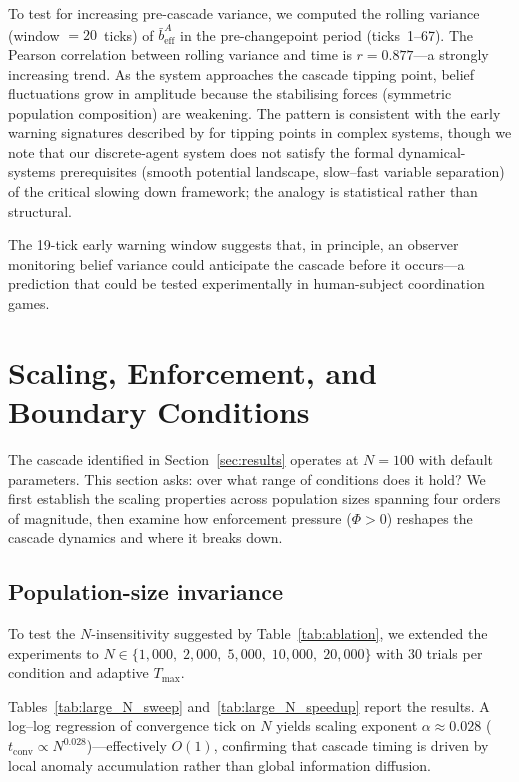 \documentclass[11pt,a4paper]{article}
\begin{document}
To test for increasing pre-cascade variance, we computed the rolling variance (window $= 20$~ticks) of $\bar{b}_{\mathrm{eff}}^A$ in the pre-changepoint period (ticks~1--67). The Pearson correlation between rolling variance and time is $r = 0.877$---a strongly increasing trend. As the system approaches the cascade tipping point, belief fluctuations grow in amplitude because the stabilising forces (symmetric population composition) are weakening. The pattern is consistent with the early warning signatures described by \citet{scheffer2009early} for tipping points in complex systems, though we note that our discrete-agent system does not satisfy the formal dynamical-systems prerequisites (smooth potential landscape, slow--fast variable separation) of the critical slowing down framework; the analogy is statistical rather than structural.

The 19-tick early warning window suggests that, in principle, an observer monitoring belief variance could anticipate the cascade before it occurs---a prediction that could be tested experimentally in human-subject coordination games.

\section{Scaling, Enforcement, and Boundary Conditions}
\label{sec:boundaries}
\label{sec:enforcement}

The cascade identified in Section~\ref{sec:results} operates at $N{=}100$ with default parameters. This section asks: over what range of conditions does it hold? We first establish the scaling properties across population sizes spanning four orders of magnitude, then examine how enforcement pressure ($\Phi > 0$) reshapes the cascade dynamics and where it breaks down.

\subsection{Population-size invariance}
\label{sec:scaling}

To test the $N$-insensitivity suggested by Table~\ref{tab:ablation}, we extended the experiments to $N \in \{1{,}000,\; 2{,}000,\; 5{,}000,\; 10{,}000,\; 20{,}000\}$ with 30 trials per condition and adaptive $T_{\max}$.

Tables~\ref{tab:large_N_sweep} and~\ref{tab:large_N_speedup} report the results. A log--log regression of convergence tick on $N$ yields scaling exponent $\alpha \approx 0.028$ ($t_{\mathrm{conv}} \propto N^{0.028}$)---effectively $O(1)$, confirming that cascade timing is driven by local anomaly accumulation rather than global information diffusion.
\end{document}
